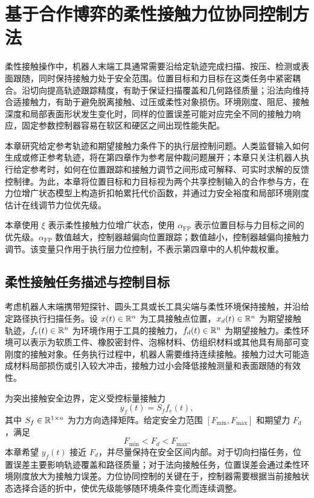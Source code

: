 \chapter{基于合作博弈的柔性接触力位协同控制方法}
\label{chap:ch3_force_position_game}

柔性接触操作中，机器人末端工具通常需要沿给定轨迹完成扫描、按压、检测或表面跟随，同时保持接触力处于安全范围。位置目标和力目标在这类任务中紧密耦合。沿切向提高轨迹跟踪精度，有助于保证扫描覆盖和几何路径质量；沿法向维持合适接触力，有助于避免脱离接触、过压或柔性对象损伤。环境刚度、阻尼、接触深度和局部表面形状发生变化时，同样的位置误差可能对应完全不同的接触力响应，固定参数控制器容易在软区和硬区之间出现性能失配。

本章研究给定参考轨迹和期望接触力条件下的执行层控制问题。人类监督输入如何生成或修正参考轨迹，将在第四章作为参考层仲裁问题展开；本章只关注机器人执行给定参考时，如何在位置跟踪和接触力调节之间形成可解释、可实时求解的反馈控制律。为此，本章将位置目标和力目标视为两个共享控制输入的合作参与方，在力位增广状态模型上构造折扣帕累托代价函数，并通过力安全裕度和局部环境刚度估计在线调节力位优先级。

本章使用 $\xi$ 表示柔性接触力位增广状态，使用 $\alpha_{\mathrm{FP}}$ 表示位置目标与力目标之间的优先级。$\alpha_{\mathrm{FP}}$ 数值越大，控制器越偏向位置跟踪；数值越小，控制器越偏向接触力调节。该变量只作用于执行层力位控制，不表示第四章中的人机仲裁权重。

\section{柔性接触任务描述与控制目标}
\label{sec:ch3_problem}

考虑机器人末端携带短探针、圆头工具或长工具尖端与柔性环境保持接触，并沿给定路径执行扫描任务。设 $x(t)\in\mathbb{R}^n$ 为工具接触点位置，$x_d(t)\in\mathbb{R}^n$ 为期望接触轨迹，$f_e(t)\in\mathbb{R}^n$ 为环境作用于工具的接触力，$f_d(t)\in\mathbb{R}^n$ 为期望接触力。柔性环境可以表示为软质工件、橡胶密封件、泡棉材料、仿组织材料或其他具有局部可变刚度的接触对象。任务执行过程中，机器人需要维持连续接触。接触力过大可能造成材料局部损伤或引入较大冲击，接触力过小会降低接触测量和表面跟随的有效性。

为突出接触安全边界，定义受控标量接触力
\begin{equation}
  y_f(t)=S_f f_e(t),
  \label{eq:ch3_yf}
\end{equation}
其中 $S_f\in\mathbb{R}^{1\times n}$ 为力方向选择矩阵。给定安全力范围 $[F_{\min},F_{\max}]$ 和期望力 $F_d$，满足
\begin{equation}
  F_{\min}<F_d<F_{\max}.
  \label{eq:ch3_force_band}
\end{equation}
本章希望 $y_f(t)$ 接近 $F_d$，并尽量保持在安全区间内部。对于切向扫描任务，位置误差主要影响轨迹覆盖和路径质量；对于法向接触任务，位置误差会通过柔性环境刚度放大为接触力误差。力位协同控制的关键在于，控制器需要根据当前接触状态选择合适的折中，使优先级能够随环境条件变化而连续调整。

